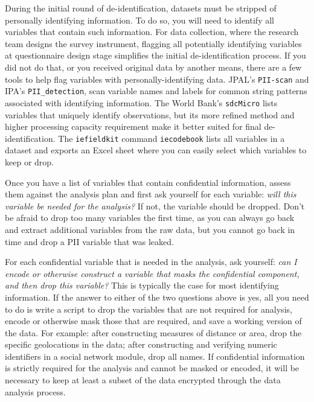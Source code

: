 During the initial round of de-identification,
datasets must be stripped of personally identifying information.
To do so, you will need to identify all variables that contain
such information.
For data collection, where the research team designs the survey instrument,
flagging all potentially identifying variables at questionnaire design stage
simplifies the initial de-identification process.
If you did not do that, or you received original data by another means,
there are a few tools to help flag variables with personally-identifying data.
JPAL's \texttt{PII-scan} and
IPA's \texttt{PII\_detection},
scan variable names and labels for common string patterns associated with identifying information.
The World Bank's \texttt{sdcMicro}
lists variables that uniquely identify observations,
but its more refined method and
higher processing capacity requirement make it better suited for final de-identification.
The \texttt{iefieldkit} command \texttt{iecodebook}
lists all variables in a dataset and exports an Excel sheet
where you can easily select which variables to keep or drop.

Once you have a list of variables that contain confidential information,
assess them against the analysis plan and first ask yourself for each variable:
\textit{will this variable be needed for the analysis?}
If not, the variable should be dropped.
Don't be afraid to drop too many variables the first time,
as you can always go back and extract additional variables from the raw data,
but you cannot go back in time and drop a PII variable that was leaked.

For each confidential variable that is needed in the analysis, ask yourself:
\textit{can I encode or otherwise construct a variable that masks the confidential component, and
	then drop this variable?}
This is typically the case for most identifying information.
If the answer to either of the two questions above is yes,
all you need to do is write a script to drop the variables that are not required for analysis,
encode or otherwise mask those that are required,
and save a working version of the data.
For example:
after constructing measures of distance or area,
drop the specific geolocations in the data;
after constructing and verifying numeric identifiers in
a social network module, drop all names.
If confidential information is strictly required for the analysis and cannot be
masked or encoded,
it will be necessary to keep at least a subset of the data encrypted through
the data analysis process.

